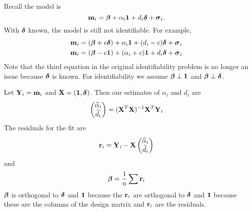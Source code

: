 \documentclass[12pt]{article}
\newcommand{\V}[1]{{\bm{\mathbf{\MakeLowercase{#1}}}}} %
\newcommand{\M}[1]{{\bm{\mathbf{\MakeUppercase{#1}}}}} %
\begin{document}
%
%
Recall the model is
\begin{equation*}
\V{m}_i = \V{\beta} + \alpha_i \V{1} + d_i \V{\delta} + \V{\sigma}_i.
\end{equation*}
With $\V{\delta}$ known, the model is still not identifiable. For example,
\begin{align*}
\V{m}_i &= (\V{\beta} + c\V{\delta}) + \alpha_i \V{1} + (d_i - c) \V{\delta} + \V{\sigma}_i\\
\V{m}_i &= (\V{\beta} - c\V{1}) + (\alpha_i + c)\V{1} + d_i\V{\delta} + \V{\sigma}_i\\
\end{align*}
Note that the third equation in the original identifiability problem is no longer an issue because $\V{\delta}$ is known. For identifiability we assume $\V{\beta} \perp \V{1}$ and $\V{\beta} \perp \V{\delta}$.

Let $\M{Y}_i=\V{m}_i$ and $\M{X} = (\V{1},\V{\delta})$. Then our estimates of $\alpha_i$ and $d_i$ are
\begin{equation*}
\begin{pmatrix}
\widehat{\alpha}_i \\\widehat{d}_i
\end{pmatrix}
 = (\M{X}^T\M{X})^{-1}\M{X}^T\M{Y}_i
\end{equation*}
The residuals for the fit are
\begin{equation*}
\V{r}_i = \M{Y}_i - \M{X}\begin{pmatrix}
\widehat{\alpha}_i \\\widehat{d}_i
\end{pmatrix}
\end{equation*}
and 
\begin{equation*}
\V{\beta} = \frac{1}{n}\sum \V{r}_i
\end{equation*}
$\V{\beta}$ is orthogonal to $\V{\delta}$ and $\V{1}$ because the $\V{r}_i$ are orthogonal to $\V{\delta}$ and $\V{1}$ because these are the columns of the design matrix and $\V{r}_i$ are the residuals.
\end{document}
